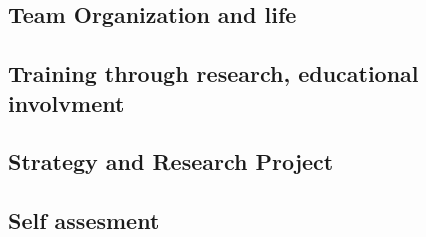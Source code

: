 


\subsection{Team Organization and life} %
\label{sub:hadas_team_organization_and_life}




\subsection{Training through research, educational involvment} %
\label{sub:hadas_training_through_research_educational_involvment}




\subsection{Strategy and Research Project} %
\label{sub:hadas_strategy_and_research_project}




\subsection{Self assesment} %
\label{sub:hadas_self_assesment}




